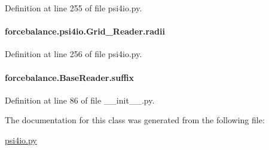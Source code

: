 Definition at line 255 of file psi4io.\-py.

\hypertarget{classforcebalance_1_1psi4io_1_1Grid__Reader_a82c8a907130461776b26605ee022f951}{
\paragraph[{radii}]{\setlength{\rightskip}{0pt plus 5cm}forcebalance.\-psi4io.\-Grid\-\_\-\-Reader.\-radii}}\label{classforcebalance_1_1psi4io_1_1Grid__Reader_a82c8a907130461776b26605ee022f951}


Definition at line 256 of file psi4io.\-py.

\hypertarget{classforcebalance_1_1BaseReader_a48ef0584a1b6b4b6f8eb741ad8465db8}{
\paragraph[{suffix}]{\setlength{\rightskip}{0pt plus 5cm}forcebalance.\-Base\-Reader.\-suffix\hspace{0.3cm}{\ttfamily [inherited]}}}\label{classforcebalance_1_1BaseReader_a48ef0584a1b6b4b6f8eb741ad8465db8}


Definition at line 86 of file \-\_\-\-\_\-init\-\_\-\-\_\-.\-py.



The documentation for this class was generated from the following file\-:\begin{DoxyCompactItemize}
\item 
\hyperlink{psi4io_8py}{psi4io.\-py}\end{DoxyCompactItemize}
